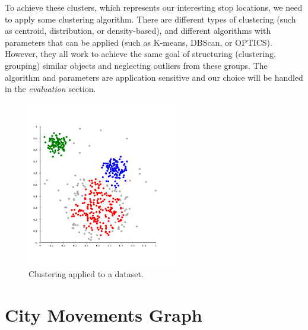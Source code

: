  To achieve these clusters, which represents our interesting stop locations, we need to apply some clustering algorithm. There are different types of clustering (such as centroid, distribution, or density-based), and different algorithms with parameters that can be applied (such as K-means, DBScan, or OPTICS). However, they all work to achieve the same goal of structuring (clustering, grouping) similar objects and neglecting outliers from these groups. The algorithm and parameters are application sensitive and our choice will be handled in the \textit{evaluation} section.

\begin{figure}[!ht]
	\centering
	\includegraphics[width=0.6\textwidth]{images/clustering.png}
	\caption{ Clustering applied to a dataset. }
	\label{fig:clustering}
\end{figure} 



\FloatBarrier
\section{City Movements Graph}

\FloatBarrier